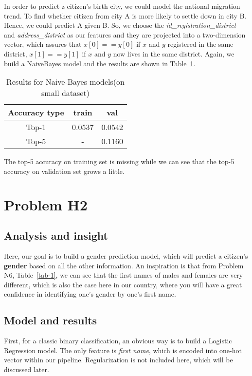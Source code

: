 \documentclass{article}
\begin{document}
\begin{itemize}
In order to predict z citizen's birth city, we could model the national migration trend. To find whether citizen from city A is more likely to settle down in city B. Hence, we could predict A given B. So, we choose the \emph{id\_registration\_district} and \emph{address\_district} as our features and they are projected into a two-dimension vector, which assures that $x[0] == y[0]$ if $x$ and $y$ registered in the same district, $x[1] == y[1]$ if $x$ and $y$ now lives in the same district. Again, we build a NaiveBayes model and the results are shown in Table~\ref{tab-1-2}.
\begin{table}[ht]
\centering
\caption{Results for Naive-Bayes models(on small dataset)}
\label{tab-1-2}
\begin{tabular}{ccc}
\toprule
Accuracy type & train & val \\
\midrule
Top-1 & 0.0537 & 0.0542 \\
Top-5 & - & 0.1160 \\
\bottomrule
\end{tabular}
\end{table}

The top-5 accuracy on training set is missing while we can see that the top-5 accuracy on validation set grows a little.

\end{itemize}


\section{Problem H2}

\subsection{Analysis and insight}
Here, our goal is to build a gender prediction model, which will predict a citizen's \textbf{gender} based on all the other information. An inspiration is that from Problem N6, Table~\ref{tab-1}, we can see that the first names of males and females are very different, which is also the case here in our country, where you will have a great confidence in identifying one's gender by one's first name.

\subsection{Model and results}

First, for a classic binary classification, an obvious way is to build a Logistic Regression model. The only feature is \emph{first name}, which is encoded into one-hot vector within our pipeline. Regularization is not included here, which will be discussed later.
\end{document}
